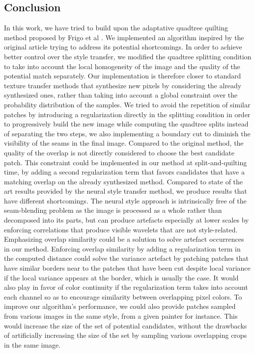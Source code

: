 \documentclass[a4paper]{article}
\begin{document}
\subsection{Conclusion}
In this work, we have tried to build upon the adaptative quadtree quilting method proposed by Frigo et al \cite{adaptative-quilting}. We implemented an algorithm inspired by the original article trying to address its potential shortcomings. In order to achieve better control over the style transfer, we modified the quadtree splitting condition to take into account the local homogeneity of the image and the quality of the potential match separately. Our implementation is therefore closer to standard texture transfer methods that synthesize new pixels by considering the already synthesized ones, rather than taking into account a global constraint over the probability distribution of the samples. We tried to avoid the repetition of similar patches by introducing a regularization directly in the splitting condition in order to progressively build the new image while computing the quadtree splits instead of separating the two steps, we also implementing a boundary cut to diminish the visibility of the seams in the final image. 
Compared to the original method, the quality of the overlap is not directly considered to choose the best candidate patch. This constraint could be implemented in our method at split-and-quilting time, by adding a second regularization term that favors candidates that have a matching overlap on the already synthesized method.
Compared to state of the art results provided by the neural style transfer method, we produce results that have different shortcomings. The neural style approach is intrinsically free of the seam-blending problem as the image is processed as a whole rather than decomposed into its parts, but can produce artefacts especially at lower scales by enforcing correlations that produce visible wavelets that are not style-related.
Emphasizing overlap similarity could be a solution to solve artefact occurrences in our method. Enforcing overlap similarity by adding a regularization term in the computed distance could solve the variance artefact by patching patches that have similar borders near to the patches that have been cut despite local variance if the local variance appears at the border, which is usually the case. It would also play in favor of color continuity if the regularization term takes into account each channel so as to encourage similarity between overlapping pixel colors. 
To improve our algorithm's performance, we could also provide patches sampled from various images in the same style, from a given painter for instance. This would increase the size of the set of potential candidates, without the drawbacks of artificially increasing the size of the set by sampling various overlapping crops in the same image.
\end{document}
